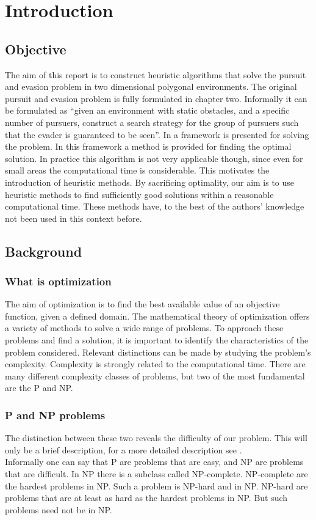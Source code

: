 \chapter{Introduction}

\section{Objective}
The aim of this report is to construct heuristic algorithms that solve the pursuit and evasion problem in two dimensional polygonal environments. The original pursuit and evasion problem is fully formulated in chapter two. Informally it can be formulated as ``given an environment with static obstacles, and a specific number of pursuers, construct a search strategy for the group of pursuers such that the evader is guaranteed to be seen''. In \cite{paper3} a framework is presented for solving the problem. In this framework a method is provided for finding the optimal solution. In practice this algorithm is not very applicable though, since even for small areas the computational time is considerable. This motivates the introduction of heuristic methods. By sacrificing optimality, our aim is to use heuristic methods to find sufficiently good solutions within a reasonable computational time. These methods have, to the best of the authors' knowledge not been used in this context before.
\section{Background}
\subsection{What is optimization}
The aim of optimization is to find the best available value of an objective function, given a defined domain. %
The mathematical theory of optimization offers a variety of methods to solve a wide range of problems. To approach these problems and find a solution, it is important to identify the characteristics of the problem considered. Relevant distinctions can be made by studying the problem's complexity. Complexity is strongly related to the computational time. There are many different complexity classes of problems, but two of the most fundamental are the P and NP.

\subsection{P and NP problems}
The distinction between these two reveals the difficulty of our problem. This will only be a brief description, for a more detailed description see \cite{NP}.\\
Informally one can say that P are problems that are easy, and NP are problems that are difficult. In NP there is a subclass called NP-complete. NP-complete are the hardest problems in NP\cite{adk19}. Such a problem is NP-hard and in NP. NP-hard are problems that are at least as hard as the hardest problems in NP. But such problems need not be in NP\cite{adk19}.


